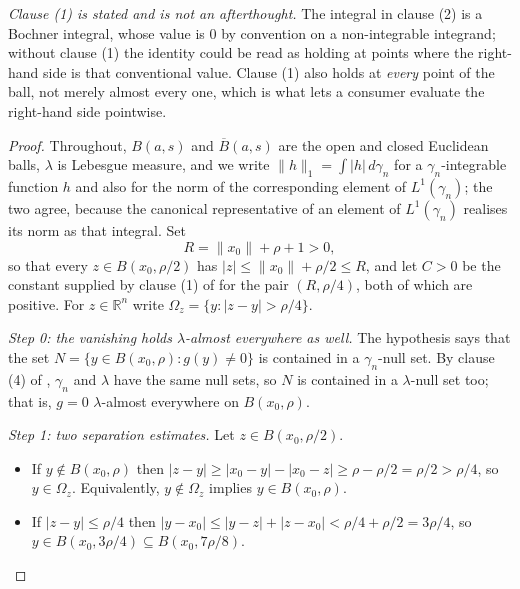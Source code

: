 \begin{lemma}
\emph{Clause (1) is stated and is not an afterthought.}  The integral in clause
(2) is a Bochner integral, whose value is $0$ by convention on a
non-integrable integrand; without clause (1) the identity could be read as
holding at points where the right-hand side is that conventional value.  Clause
(1) also holds at \emph{every} point of the ball, not merely almost every one,
which is what lets a consumer evaluate the right-hand side pointwise.
\end{lemma}
\begin{proof}
Throughout, $B(a,s)$ and $\overline B(a,s)$ are the open and closed Euclidean
balls, $\lambda$ is Lebesgue measure, and we write $\|h\|_1 = \int|h|\,d\gamma_n$
for a $\gamma_n$-integrable function $h$ and also for the norm of the
corresponding element of $L^1(\gamma_n)$; the two agree, because the canonical
representative of an element of $L^1(\gamma_n)$ realises its norm as that
integral.  Set
\[
  R = \|x_0\| + \rho + 1 > 0 ,
\]
so that every $z \in B(x_0,\rho/2)$ has $|z| \leq \|x_0\| + \rho/2 \leq R$, and
let $C > 0$ be the constant supplied by clause (1) of
 for the pair $(R,\rho/4)$, both of which
are positive.  For $z \in \mathbb{R}^n$ write
$\Omega_z = \{y : |z-y| > \rho/4\}$.

\emph{Step 0: the vanishing holds $\lambda$-almost everywhere as well.}
The hypothesis says that the set $N = \{y \in B(x_0,\rho) : g(y) \neq 0\}$ is
contained in a $\gamma_n$-null set.  By clause (4) of
, $\gamma_n$ and $\lambda$ have the same
null sets, so $N$ is contained in a $\lambda$-null set too; that is, $g = 0$
$\lambda$-almost everywhere on $B(x_0,\rho)$.

\emph{Step 1: two separation estimates.}
Let $z \in B(x_0,\rho/2)$.
\begin{itemize}
\item[(a)] If $y \notin B(x_0,\rho)$ then
$|z-y| \geq |x_0-y| - |x_0-z| \geq \rho - \rho/2 = \rho/2 > \rho/4$, so
$y \in \Omega_z$.  Equivalently, $y \notin \Omega_z$ implies
$y \in B(x_0,\rho)$.
\item[(b)] If $|z-y| \leq \rho/4$ then
$|y-x_0| \leq |y-z| + |z-x_0| < \rho/4 + \rho/2 = 3\rho/4$, so
$y \in B(x_0,3\rho/4) \subseteq B(x_0,7\rho/8)$.
\end{itemize}


\end{proof}
